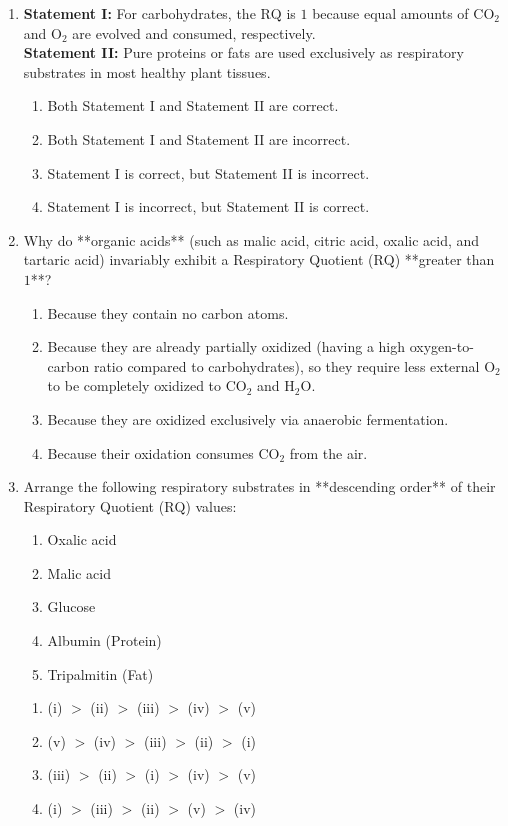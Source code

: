 \documentclass[11pt, a4paper]{article}
\begin{document}
\begin{enumerate}[label=\textbf{\arabic*.}]
\item \textbf{Statement I:} For carbohydrates, the $\text{RQ}$ is $1$ because equal amounts of $\text{CO}_2$ and $\text{O}_2$ are evolved and consumed, respectively. \\
\textbf{Statement II:} Pure proteins or fats are used exclusively as respiratory substrates in most healthy plant tissues.
\begin{enumerate}[label=(\Alph*)]
    \item Both Statement I and Statement II are correct.
    \item Both Statement I and Statement II are incorrect.
    \item Statement I is correct, but Statement II is incorrect.
    \item Statement I is incorrect, but Statement II is correct.
\end{enumerate}

\item Why do **organic acids** (such as malic acid, citric acid, oxalic acid, and tartaric acid) invariably exhibit a Respiratory Quotient ($\text{RQ}$) **greater than $1$**?
\begin{enumerate}[label=(\Alph*)]
    \item Because they contain no carbon atoms.
    \item Because they are already partially oxidized (having a high oxygen-to-carbon ratio compared to carbohydrates), so they require less external $\text{O}_2$ to be completely oxidized to $\text{CO}_2$ and $\text{H}_2\text{O}$.
    \item Because they are oxidized exclusively via anaerobic fermentation.
    \item Because their oxidation consumes $\text{CO}_2$ from the air.
\end{enumerate}

\item Arrange the following respiratory substrates in **descending order** of their Respiratory Quotient ($\text{RQ}$) values:
\begin{enumerate}[label=(\roman*)]
    \item Oxalic acid
    \item Malic acid
    \item Glucose
    \item Albumin (Protein)
    \item Tripalmitin (Fat)
\end{enumerate}
\begin{enumerate}[label=(\Alph*)]
    \item (i) $>$ (ii) $>$ (iii) $>$ (iv) $>$ (v)
    \item (v) $>$ (iv) $>$ (iii) $>$ (ii) $>$ (i)
    \item (iii) $>$ (ii) $>$ (i) $>$ (iv) $>$ (v)
    \item (i) $>$ (iii) $>$ (ii) $>$ (v) $>$ (iv)
\end{enumerate}


\end{enumerate}
\end{document}
